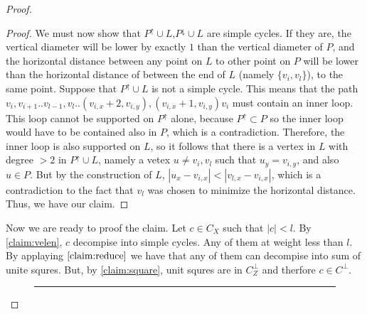\begin{proof}
\begin{proof}
We must now show that $P^{\uparrow}\cup L$,$P^{\downarrow}\cup L$ are simple cycles. If they are, the vertical diameter will be lower by exactly $1$ than the vertical diameter of $P$, and the horizontal distance between any point on $L$ to other point on $P$ will be lower than the horizontal distance of between the end of $L$ (namely $\{v_{i},v_{l}\}$), to the same point. Suppose that $P^{\uparrow}\cup L$ is not a simple cycle. This means that the path $v_{i},v_{i+1}..v_{l-1},v_{l}.. \left( v_{i,x}+2, v_{i,y} \right), \left( v_{i,x}+1, v_{i,y} \right)v_{i}$ must contain an inner loop. This loop cannot be supported on $P^{\uparrow}$ alone, because $P^{\uparrow} \subset P$ so the inner loop would have to be contained also in $P$, which is a contradiction. Therefore, the inner loop is also supported on $L$, so it follows that there is a vertex in $L$ with degree $>2$ in $P^{\uparrow}\cup L$, namely a vetex $u \neq v_{i},v_{l}$ such that $u_{y} = v_{i,y}$, and also $u \in P$. But by the construction of $L$, $|u_{x} - v_{i,x}| < |v_{l,x} - v_{i,x}|$, which is a contradiction to the fact that $v_{l}$ was chosen to minimize the horizontal distance. Thus, we have our claim.
  \end{proof}

  Now we are ready to proof the claim. Let $c\in C_{X}$ such that $|c| < l$. By \cref{claim:velen}, $c$ decompise into simple cycles. Any of them at weight less than $l$. By applaying $\cref{claim:reduce}$ we have that any of them can decompise into sum of unite squres. But, by \cref{claim:square}, unit squres are in $C_{Z}^{\perp}$ and therfore $c \in C^{\perp}$. 

    \begin{wrapfigure}{R}{2cm}
      \rule{1cm}{1cm}
\end{wrapfigure}
%


\end{proof}

